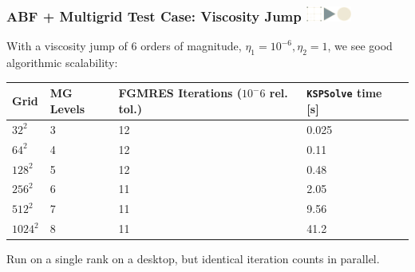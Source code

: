 \documentclass{beamer}
\newcommand\frametitlelogo[1]{\frametitle{#1\hspace{0pt plus 1 filll} \includegraphics[width=42pt]{logo_slides}}}
\begin{document}

%



\begin{frame}[fragile]
\frametitlelogo{ABF + Multigrid Test Case: Viscosity Jump}
  With a viscosity jump of 6 orders of magnitude, $\eta_1 = 10^{-6}, \eta_2 = 1$,
  we see good algorithmic scalability:
    \begin{table}[]
\begin{tabular}{lllll}
  Grid &  MG Levels & FGMRES Iterations ($10^-6$ rel. tol.) &  \texttt{KSPSolve} time [s]  \\
  \hline
   $32^2$  & 3 &  12 & 0.025 \\
   $64^2$  & 4 &  12 & 0.11 \\
   $128^2$  & 5 &  12 & 0.48 \\
   $256^2$  & 6 &  11 & 2.05 \\
   $512^2$  & 7 &  11 & 9.56 \\
   $1024^2$ & 8 &  11 & 41.2 \\
\end{tabular}
\end{table}
Run on a single rank on a desktop, but identical iteration counts in parallel.

\end{frame}
\end{document}
